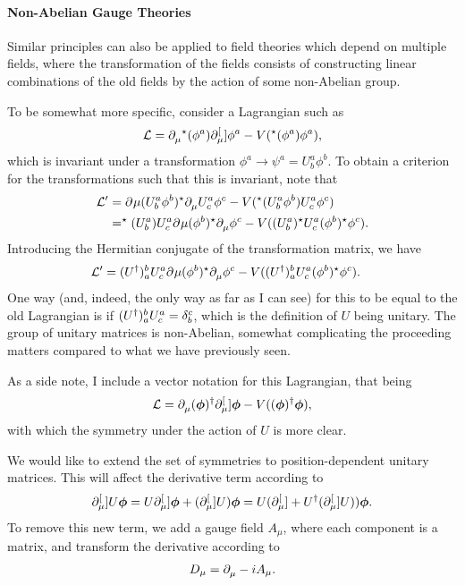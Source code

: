 \paragraph{Non-Abelian Gauge Theories}
Similar principles can also be applied to field theories which depend on multiple fields, where the transformation of the fields consists of constructing linear combinations of the old fields by the action of some non-Abelian group.

To be somewhat more specific, consider a Lagrangian such as
\begin{align*}
	\mathcal{L} = \partial^{}_{\mu}{^{\star}{(\phi^{a})}}\partial^{[}_{\mu}]{}{\phi^{a}} - V(^{\star}{(\phi^{a})}\phi^{a}),
\end{align*}
which is invariant under a transformation $\phi^{a} \to \psi^{a} = U_{b}^{a}\phi^{b}$. To obtain a criterion for the transformations such that this is invariant, note that
\begin{align*}
	\mathcal{L}^{\prime} &= \partial^{}_{}{\mu}{(U_{b}^{a}\phi^{b})^{\star}}\partial^{}_{\mu}{}U_{c}^{a}\phi^{c} - V(^{\star}{(U_{b}^{a}\phi^{b})}U_{c}^{a}\phi^{c}) \\
	              &= ^{\star}{(U_{b}^{a})}U_{c}^{a}\partial^{}_{}{\mu}(\phi^{b})^{\star}\partial^{}_{\mu}{}\phi^{c} - V((U_{b}^{a})^{\star} U_{c}^{a}(\phi^{b})^{\star}\phi^{c}).
\end{align*}
Introducing the Hermitian conjugate of the transformation matrix, we have
\begin{align*}
	\mathcal{L}^{\prime} &= (U^{\dagger})_{a}^{b}U_{c}^{a}\partial^{}_{}{\mu}(\phi^{b})^{\star}\partial^{}_{\mu}{}\phi^{c} - V((U^{\dagger})_{a}^{b}U_{c}^{a}(\phi^{b})^{\star}\phi^{c}).
\end{align*}
One way (and, indeed, the only way as far as I can see) for this to be equal to the old Lagrangian is if $(U^{\dagger})_{a}^{b}U_{c}^{a} = \kdelta{c}{b}$, which is the definition of $U$ being unitary. The group of unitary matrices is non-Abelian, somewhat complicating the proceeding matters compared to what we have previously seen.

As a side note, I include a vector notation for this Lagrangian, that being
\begin{align*}
	\mathcal{L} = \partial^{}_{\mu}{(\vb*{\phi})^{\dagger}}\partial^{[}_{\mu}]{}{\vb*{\phi}} - V((\vb*{\phi})^{\dagger}\vb*{\phi}),
\end{align*}
with which the symmetry under the action of $U$ is more clear.

We would like to extend the set of symmetries to position-dependent unitary matrices. This will affect the derivative term according to
\begin{align*}
	\partial^{[}_{\mu}]{}{U\vb*{\phi}} = U\partial^{[}_{\mu}]{}{\vb*{\phi}} + (\partial^{[}_{\mu}]{}{U})\vb*{\phi} = U(\partial^{[}_{\mu}]{}{} + U^{\dagger}(\partial^{[}_{\mu}]{}{U}))\vb*{\phi}.
\end{align*}
To remove this new term, we add a gauge field $A_{\mu}$, where each component is a matrix, and transform the derivative according to
\begin{align*}
	D_{\mu} = \partial^{}_{\mu}{} - iA_{\mu}.
\end{align*}

